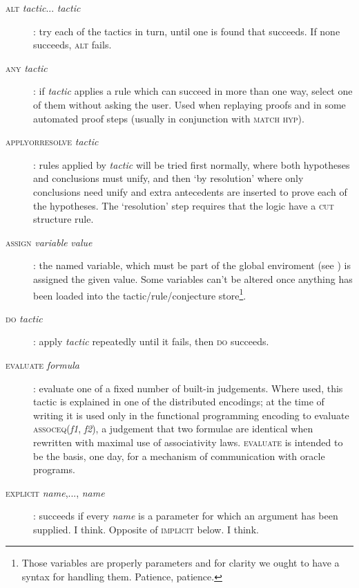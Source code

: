 \begin{description}
\item[\textsc{alt} \textit{tactic}... \textit{tactic}]: try each of the tactics in turn, until one is found that succeeds. If none succeeds, \textsc{alt} fails.

\item [\textsc{any} \textit{tactic}]: if \textit{tactic} applies a rule which can succeed in more than one way, select one of them without asking the user. Used when replaying proofs and in some automated proof steps (usually in conjunction with \textsc{match hyp}).

\item [\textsc{applyorresolve} \textit{tactic}]: rules applied by \textit{tactic} will be tried first normally, where both hypotheses and conclusions must unify, and then `by resolution' where only conclusions need unify and extra antecedents are inserted to prove each of the hypotheses. The `resolution' step requires that the logic have a \textsc{cut} structure rule.


\item [\textsc{assign} \textit{variable} \textit{value}]: the named variable, which must be part of the global enviroment (see ) is assigned the given value. Some variables can't be altered once anything has been loaded into the tactic/rule/conjecture store\footnote{Those variables are properly parameters and for clarity we ought to have a syntax for handling them. Patience, patience.}.


\item [\textsc{do} \textit{tactic}]: apply \textit{tactic} repeatedly until it fails, then \textsc{do} succeeds.


\item [\textsc{evaluate} \textit{formula} ]: evaluate one of a fixed number of built-in judgements. Where used, this tactic is explained in one of the distributed encodings; at the time of writing it is used only in the functional programming encoding to evaluate \textsc{assoceq}(\textit{f1}, \textit{f2}), a judgement that two formulae are identical when rewritten with maximal use of associativity laws. \textsc{evaluate} is intended to be the basis, one day, for a mechanism of communication with oracle programs.


\item [\textsc{explicit} \textit{name},..., \textit{name}]: succeeds if every \textit{name} is a parameter for which an argument has been supplied. I think. Opposite of \textsc{implicit} below. I think.



\end{description}
